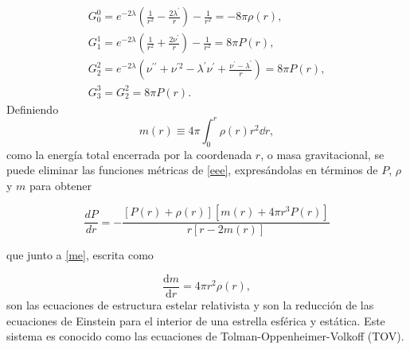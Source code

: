 \begin{equation}
    \begin{array} { l } { G _ { 0 } ^ { 0 } = e ^ { - 2 \lambda } \left( \frac { 1 } { r ^ { 2 } } - \frac { 2 \lambda ^ { \prime } } { r } \right) - \frac { 1 } { r ^ { 2 } } = - 8 \pi  \rho ( r ) }, \\ { G _ { 1 } ^ { 1 } = e ^ { - 2 \lambda } \left( \frac { 1 } { r ^ { 2 } } + \frac { 2 \nu ^ { \prime } } { r } \right) - \frac { 1 } { r ^ { 2 } } = 8 \pi  P ( r ) }, \\ { G _ { 2 } ^ { 2 } = e ^ { - 2 \lambda } \left( \nu ^ { \prime \prime } + \nu ^ { \prime 2 } - \lambda ^ { \prime } \nu ^ { \prime } + \frac { \nu ^ { \prime } - \lambda ^ { \prime } } { r } \right) = 8 \pi  P ( r ) }, \\ { G _ { 3 } ^ { 3 } = G _ { 2 } ^ { 2 } = 8 \pi  P ( r ) }. \end{array}
    \label{eee}
\end{equation}
Definiendo
\begin{equation}
    m ( r ) \equiv 4 \pi \int _ { 0 } ^ { r } \rho ( r ) r ^ { 2 } \dd r,
    \label{me}
\end{equation}
como la energía total encerrada por la coordenada $r$, o masa gravitacional, se puede eliminar las funciones métricas de \eqref{eee}, expresándolas en términos de $P$, $\rho$ y $m$ para obtener 

\begin{equation}
    \frac { d P } { d r } = - \frac { [ P ( r ) + \rho ( r ) ] \left[ m ( r ) + 4 \pi r ^ { 3 } P ( r ) \right] } { r [ r - 2 m ( r ) ] }
    \label{dptov}
\end{equation}

que junto a \eqref{me}, escrita como

\begin{equation}
    \frac { \mathrm { d } m } { \mathrm { d } r } = 4 \pi r ^ { 2 } \rho(r),
    \label{dmtov}
\end{equation}
son las ecuaciones de estructura estelar relativista y son la reducción de las ecuaciones de Einstein para el interior de una estrella esférica y estática. Este sistema es conocido como las ecuaciones de Tolman-Oppenheimer-Volkoff (TOV).

